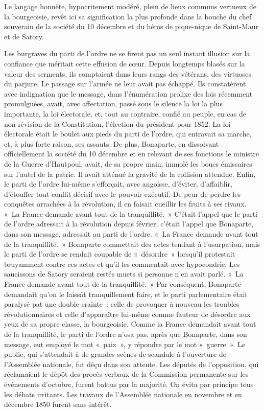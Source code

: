 \documentclass[french,twoside]{book} %
\begin{document}
\noindent Le langage honnête, hypocritement modéré, plein de lieux communs vertueux de la bourgeoisie, revêt ici sa signification la plus profonde dans la bouche du chef souverain de la société du 10 décembre et du héros de pique-nique de Saint-Maur et de Satory.\par
Les burgraves du parti de l’ordre ne se firent pas un seul instant illusion sur la confiance que méritait cette effusion de cœur. Depuis longtemps blasés sur la valeur des serments, ils comptaient dans leurs rangs des vétérans, des virtuoses du parjure. Le passage sur l’armée ne leur avait pas échappé. Ils constatèrent avec indignation que le message, dans l’énumération prolixe des lois récemment promulguées, avait, avec affectation, passé sous le silence la loi la plus importante, la loi électorale, et, tout au contraire, confié au peuple, en cas de non-révision de la Constitution, l’élection du président pour 1852. La loi électorale était le boulet aux pieds du parti de l’ordre, qui entravait sa marche, et, à plus forte raison, ses assauts. De plus, Bonaparte, en dissolvant officiellement la société du 10 décembre et en relevant de ses fonctions le ministre de la Guerre d’Hautpoul, avait, de sa propre main, immolé les boucs émissaires sur l’autel de la patrie. Il avait atténué la gravité de la collision attendue. Enfin, le parti de l’ordre lui-même s’efforçait, avec angoisse, d’éviter, d’affaiblir, d’étouffer tout conflit décisif avec le pouvoir exécutif. De peur de perdre les conquêtes arrachées à la révolution, il en faisait cueillir les fruits à ses rivaux. « La France demande avant tout de la tranquillité. » C’était l’appel que le parti de l’ordre adressait à la révolution depuis février, c’était l’appel que Bonaparte, dans son message, adressait au parti de l’ordre. « La France demande avant tout de la tranquillité. » Bonaparte commettait des actes tendant à l’usurpation, mais le parti de l’ordre se rendait coupable de « désordre » lorsqu’il protestait bruyamment contre ces actes et qu’il les commentait avec hypocondrie. Les saucissons de Satory seraient restés muets si personne n’en avait parlé. « La France demande avant tout de la tranquillité. » Par conséquent, Bonaparte demandait qu’on le laissât tranquillement faire, et le parti parlementaire était paralysé pat une double crainte : celle de provoquer à nouveau les troubles révolutionnaires et celle d’apparaître lui-même comme fauteur de désordre aux yeux de sa propre classe, la bourgeoisie. Comme la France demandait avant tout de la tranquillité, le parti de l’ordre n’osa pas, après que Bonaparte, dans son message, eut employé le mot « paix », y répondre par le mot « guerre ». Le public, qui s’attendait à de grandes scènes de scandale à l’ouverture de l’Assemblée nationale, fut déçu dans son attente. Les députés de l’opposition, qui réclamaient le dépôt des procès-verbaux de la Commission permanente sur les événements d’octobre, furent battus par la majorité. On évita par principe tous les débats irritants. Les travaux de l’Assemblée nationale en novembre et en décembre 1850 furent sans intérêt.\par
\end{document}
